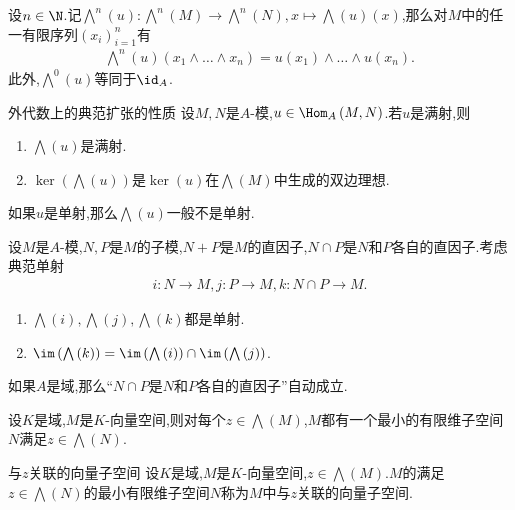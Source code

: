 \begin{remark}{}{}
	设$n\in\N$.记$\bigwedge\limits^{n}\left(u\right):\bigwedge\limits^{n}\left(M\right)\to\bigwedge\limits^{n}\left(N\right),x\mapsto\bigwedge\left(u\right)\left(x\right)$,那么对$M$中的任一有限序列$\left(x_{i}\right)_{i=1}^{n}$有
	\begin{align*}
		\bigwedge\limits^{n}\left(u\right)\left(x_{1}\wedge\ldots\wedge x_{n}\right)=u\left(x_{1}\right)\wedge\ldots\wedge u\left(x_{n}\right).
	\end{align*}
	此外,$\bigwedge\limits^{0}\left(u\right)$等同于$\id_{A}$.
\end{remark}

\begin{proposition}{外代数上的典范扩张的性质}{}
	设$M,N$是$A$-模,$u\in\Hom_{A}\left(M,N\right)$.若$u$是满射,则
	\begin{enumerate}
		\item $\bigwedge\left(u\right)$是满射.
		\item $\ker\left(\bigwedge\left(u\right)\right)$是$\ker\left(u\right)$在$\bigwedge\left(M\right)$中生成的双边理想.
	\end{enumerate}
\end{proposition}

\begin{remark}{}{}
	如果$u$是单射,那么$\bigwedge\left(u\right)$一般不是单射.
\end{remark}

\begin{proposition}{}{}
	设$M$是$A$-模,$N,P$是$M$的子模,$N+P$是$M$的直因子,$N\cap P$是$N$和$P$各自的直因子.考虑典范单射
	\begin{align*}
		i:N\to M,j:P\to M,k:N\cap P\to M.
	\end{align*}
	\begin{enumerate}
		\item $\bigwedge\left(i\right),\bigwedge\left(j\right),\bigwedge\left(k\right)$都是单射.
		\item $\im\left(\bigwedge\left(k\right)\right)=\im\left(\bigwedge\left(i\right)\right)\cap\im\left(\bigwedge\left(j\right)\right)$.
	\end{enumerate}
\end{proposition}

\begin{remark}{}{}
	如果$A$是域,那么``$N\cap P$是$N$和$P$各自的直因子''自动成立.
\end{remark}

\begin{corollary}{}{}
	设$K$是域,$M$是$K$-向量空间,则对每个$z\in\bigwedge\left(M\right)$,$M$都有一个最小的有限维子空间$N$满足$z\in\bigwedge\left(N\right)$.
\end{corollary}

\begin{definition}{与$z$关联的向量子空间}{}
	设$K$是域,$M$是$K$-向量空间,$z\in\bigwedge\left(M\right)$.$M$的满足$z\in\bigwedge\left(N\right)$的最小有限维子空间$N$称为$M$中与$z$关联的向量子空间.
\end{definition}